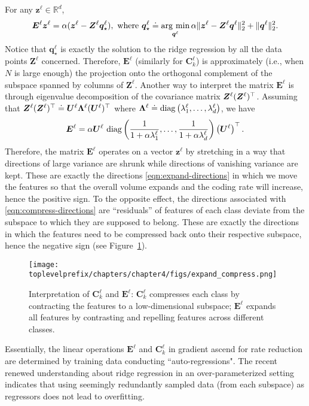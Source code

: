 \documentclass[../../book-main.tex]{subfiles}
\begin{document}
\begin{remark}\label{rem:regression-interpretation} 
For any $\bm z^\ell \in \mathbb{R}^d$,
\begin{gather}
    \bm E^\ell \bm z^\ell = \alpha(\bm z^\ell - \bm Z^\ell \bm q^\ell_\star),\
    \mbox{where}\ \bm q^\ell_\star \doteq \operatorname*{arg\ min}_{\bm q^\ell} \alpha \|\bm z^\ell - \bm Z^\ell \bm q^\ell\|_2^2 + \|\bm q^\ell\|_2^2.
\end{gather}
Notice that $\bm q^\ell_\star$ is exactly the solution to the ridge regression by all the data points $\bm Z^\ell$ concerned. Therefore, $\bm E^\ell$ (similarly for $\bm C^\ell_k$) is approximately (i.e., when $N$ is large enough) the projection onto the orthogonal complement of the subspace spanned by columns of $\bm Z^\ell$. Another way to interpret the matrix $\bm E^\ell$ is through eigenvalue decomposition of the covariance matrix $\bm{Z}^\ell (\bm{Z}^\ell)^\top$. Assuming that $\bm{Z}^\ell (\bm{Z}^\ell)^\top \doteq \bm U^\ell \bm \Lambda^\ell (\bm U^\ell)^\top$ where $\bm \Lambda^\ell \doteq \operatorname{diag}\left(\lambda^\ell_1, \ldots, \lambda^\ell_d \right)$, we have 
\begin{equation}
\bm E^\ell = \alpha \bm U^\ell\, \operatorname{diag}\left(\frac{1}{1+\alpha\lambda^\ell_1}, \ldots, \frac{1}{1+\alpha\lambda^\ell_d}\right) \left(\bm U^\ell\right)^\top.
\end{equation}
Therefore, the matrix $\bm E^\ell$ operates on a vector $\bm z^\ell$ by stretching in a way that directions of large variance are shrunk while directions of vanishing variance are kept. These are exactly the directions \eqref{eqn:expand-directions} in which we move the features so that the overall volume expands and the coding rate will increase, hence the positive sign. To the opposite effect, the directions associated with \eqref{eqn:compress-directions} are ``residuals'' of features of each class deviate from the subspace to which they are supposed to belong. These are exactly the directions in which the features need to be compressed back onto their respective subspace, hence the negative sign (see Figure~\ref{fig:regression-interpretation}). 

\begin{figure}[t]
    \centering
    \texttt{[image: \\toplevelprefix/chapters/chapter4/figs/expand\_compress.png]}
    \caption{\small Interpretation of $\bm C^\ell_k$ and $\bm E^\ell$: $\bm C^\ell_k$ compresses each class by contracting the features to a low-dimensional subspace; $\bm E^\ell$ expands all features by contrasting and repelling features across different classes.}
    \label{fig:regression-interpretation}
    \vspace{-0.1in}
\end{figure}


Essentially, the linear operations $\bm E^\ell$ and $\bm C_k^\ell$ in gradient ascend for rate reduction are determined by training data conducting ``auto-regressions". The recent renewed understanding about ridge regression in an over-parameterized setting \cite{yang2020rethinking,Wu2020OnTO} indicates that using seemingly redundantly sampled data (from each subspace) as regressors does not lead to overfitting.
\end{remark}
\end{document}
